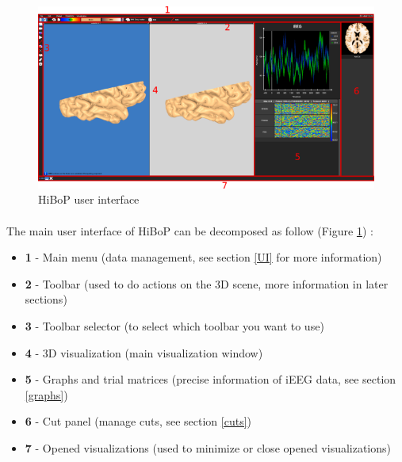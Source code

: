 \documentclass[a4paper]{article}
\begin{document}
\paragraph{}
\begin{figure}[H]
\begin{center}
\includegraphics[scale=0.7]{GlobalUI.png}
\end{center}
\caption{\label{globalUI}HiBoP user interface}
\end{figure}
\paragraph{} The main user interface of HiBoP can be decomposed as follow (Figure \ref{globalUI}) :
\begin{itemize}
\item \textbf{1} - Main menu (data management, see section \ref{UI} for more information)
\item \textbf{2} - Toolbar (used to do actions on the 3D scene, more information in later sections)
\item \textbf{3} - Toolbar selector (to select which toolbar you want to use)
\item \textbf{4} - 3D visualization (main visualization window)
\item \textbf{5} - Graphs and trial matrices (precise information of iEEG data, see section \ref{graphs})
\item \textbf{6} - Cut panel (manage cuts, see section \ref{cuts})
\item \textbf{7} - Opened visualizations (used to minimize or close opened visualizations)
\end{itemize}
\end{document}
